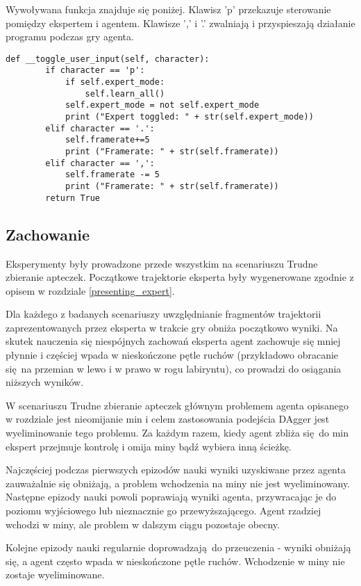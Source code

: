 Wywoływana funkcja znajduje się poniżej. Klawisz 'p' przekazuje sterowanie pomiędzy ekspertem i agentem. Klawisze ',' i '.' zwalniają i przyspieszają działanie programu podczas gry agenta.

\begin{lstlisting}[language=iPython]
    def __toggle_user_input(self, character):
        if character == 'p':
            if self.expert_mode:
                self.learn_all()
            self.expert_mode = not self.expert_mode
            print ("Expert toggled: " + str(self.expert_mode))
        elif character == '.':
            self.framerate+=5
            print ("Framerate: " + str(self.framerate))
        elif character == ',':
            self.framerate -= 5
            print ("Framerate: " + str(self.framerate))
        return True
\end{lstlisting}

\subsection{Zachowanie}
Eksperymenty były prowadzone przede wszystkim na scenariuszu Trudne zbieranie apteczek. Początkowe trajektorie eksperta były wygenerowane zgodnie z opisem w rozdziale \ref{presenting_expert}.

Dla każdego z badanych scenariuszy uwzględnianie fragmentów trajektorii zaprezentowanych przez eksperta w trakcie gry obniża początkowo wyniki. Na skutek nauczenia się niespójnych zachowań eksperta agent zachowuje się mniej płynnie i częściej wpada w nieskończone pętle ruchów (przykładowo obracanie się na przemian w lewo i w prawo w rogu labiryntu), co prowadzi do osiągania niższych wyników.

W scenariuszu Trudne zbieranie apteczek głównym problemem agenta opisanego w rozdziale  jest nieomijanie min i celem zastosowania podejścia DAgger jest wyeliminowanie tego problemu. Za każdym razem, kiedy agent zbliża się do min ekspert przejmuje kontrolę i omija miny bądź wybiera inną ścieżkę.

Najczęściej podczas pierwszych epizodów nauki wyniki uzyskiwane przez agenta zauważalnie się obniżają, a problem wchodzenia na miny nie jest wyeliminowany. Następne epizody nauki powoli poprawiają wyniki agenta, przywracając je do poziomu wyjściowego lub nieznacznie go przewyższającego. Agent rzadziej wchodzi w miny, ale problem w dalszym ciągu pozostaje obecny. 

Kolejne epizody nauki regularnie doprowadzają do przeuczenia - wyniki obniżają się, a agent często wpada w nieskończone pętle ruchów. Wchodzenie w miny nie zostaje wyeliminowane.

